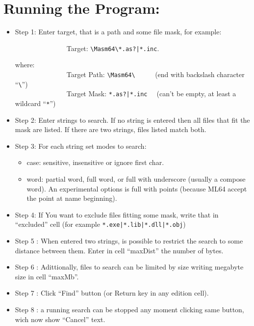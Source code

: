 \documentclass[11pt,a4paper,numbers=enddot]{scrartcl}
\begin{document}
\title{\color{myblue}{LookingFor 2.0}}
\subtitle{\color{myblue}{A Masm64 tool to find strings in files}}

\author{Héctor S. Enrique}
\date{ nov 10, 2024}
\maketitle

\section{Running the Program: }

    \begin{itemize}
        \item Step 1: Enter target, that is a path and some file mask, for example:
         
        \verb$              $ Target: \verb$\Masm64\*.as?|*.inc$. 
        
	\hspace{1cm} where:\\
        \verb$              $ Target Path: \verb$\Masm64\     $  (end with backslash character ``\verb$\$'') \\
        \verb$              $ Target Mask: \verb$*.as?|*.inc  $  (can't be empty, at least a wildcard ``\verb$*$'') 
        
        \item Step 2: Enter strings to search. If no string is entered then all files that fit the mask are listed. If there are two strings, files listed match both.
        \item Step 3: For each string set modes to search:
        
    \begin{itemize}
	 \item case: sensitive, insensitive or ignore first char.
	 \item word: partial word, full word, or full with underscore (usually a compose word). An experimental options is full with points (because ML64 accept the point at name beginning).
     \end{itemize}
        \item Step 4:  If You want to exclude files fitting some mask, write that in ``excluded'' cell (for example \verb$*.exe|*.lib|*.dll|*.obj$)
        \item Step 5 : When entered two strings, is possible to restrict the search to some distance between them. Enter in cell ``maxDist'' the number of bytes.
        \item Step 6 : Adittionally, files to search can be limited by size writing megabyte size in cell ``maxMb''.
        \item Step 7 : Click ``Find'' button (or Return key in any edition cell).
        \item Step 8 : a running search can be stopped any moment clicking same button, wich now show ``Cancel'' text.
     \end{itemize}
\end{document}
